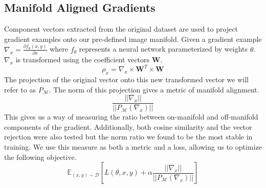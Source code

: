 


\subsection{Manifold Aligned Gradients} \label{subsec:ma}

Component vectors extracted from the original dataset are used to project gradient examples onto our pre-defined image manifold.
Given a gradient example $\nabla_x = \frac{\partial f_\theta(x, y)}{\partial x}$ where $f_\theta$ represents a neural network parameterized by weights $\theta$. $\nabla_x$ is transformed using the coefficient vectors \textbf{W}.
\begin{equation}
    \rho_x = \nabla_x \times \textbf{W}^T \times \textbf{W}    
\end{equation}
The projection of the original vector onto this new transformed vector we will refer to as $P_{\mathcal{M}}$.
The norm of this projection gives a metric of manifold alignment.
\begin{equation}
    \frac{|| \nabla_x || }{||P_{\mathcal{M}}(\nabla_x )||}
  \label{equ:ratio}
\end{equation}
This gives us a way of measuring the ratio between on-manifold and off-manifold components of the gradient.
Additionally, both cosine similarity and the vector rejection were also tested but the norm ratio we found to be the most stable in training.
We use this measure as both a metric and a loss, allowing us to optimize the following objective.
\begin{equation}
  \mathds{E}_{(x,y) \sim \mathcal{D}} \left[ L(\theta, x,y)  + \alpha \frac{|| \nabla_x || }{||P_{\mathcal{M}}(\nabla_x )||} \right]
  \label{equ:loss}
\end{equation}


